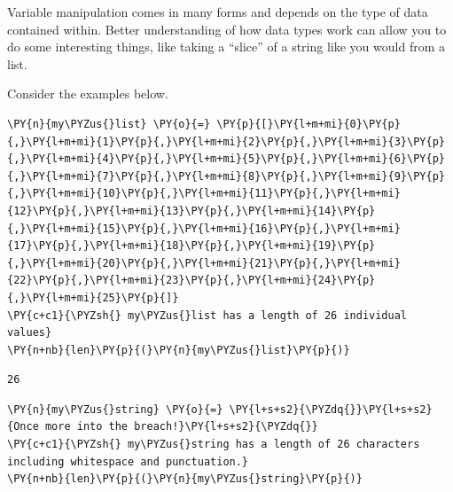 Variable manipulation comes in many forms and depends on the type of
data contained within. Better understanding of how data types work can
allow you to do some interesting things, like taking a ``slice'' of a
string like you would from a list.

Consider the examples below.

    \begin{tcolorbox}[breakable, size=fbox, boxrule=1pt, pad at break*=1mm,colback=cellbackground, colframe=cellborder]
\begin{Verbatim}[commandchars=\\\{\}]
\PY{n}{my\PYZus{}list} \PY{o}{=} \PY{p}{[}\PY{l+m+mi}{0}\PY{p}{,}\PY{l+m+mi}{1}\PY{p}{,}\PY{l+m+mi}{2}\PY{p}{,}\PY{l+m+mi}{3}\PY{p}{,}\PY{l+m+mi}{4}\PY{p}{,}\PY{l+m+mi}{5}\PY{p}{,}\PY{l+m+mi}{6}\PY{p}{,}\PY{l+m+mi}{7}\PY{p}{,}\PY{l+m+mi}{8}\PY{p}{,}\PY{l+m+mi}{9}\PY{p}{,}\PY{l+m+mi}{10}\PY{p}{,}\PY{l+m+mi}{11}\PY{p}{,}\PY{l+m+mi}{12}\PY{p}{,}\PY{l+m+mi}{13}\PY{p}{,}\PY{l+m+mi}{14}\PY{p}{,}\PY{l+m+mi}{15}\PY{p}{,}\PY{l+m+mi}{16}\PY{p}{,}\PY{l+m+mi}{17}\PY{p}{,}\PY{l+m+mi}{18}\PY{p}{,}\PY{l+m+mi}{19}\PY{p}{,}\PY{l+m+mi}{20}\PY{p}{,}\PY{l+m+mi}{21}\PY{p}{,}\PY{l+m+mi}{22}\PY{p}{,}\PY{l+m+mi}{23}\PY{p}{,}\PY{l+m+mi}{24}\PY{p}{,}\PY{l+m+mi}{25}\PY{p}{]}
\PY{c+c1}{\PYZsh{} my\PYZus{}list has a length of 26 individual values}
\PY{n+nb}{len}\PY{p}{(}\PY{n}{my\PYZus{}list}\PY{p}{)}
\end{Verbatim}
\end{tcolorbox}

            \begin{tcolorbox}[breakable, size=fbox, boxrule=.5pt, pad at break*=1mm, opacityfill=0]
\begin{Verbatim}[commandchars=\\\{\}]
26
\end{Verbatim}
\end{tcolorbox}
        
    \begin{tcolorbox}[breakable, size=fbox, boxrule=1pt, pad at break*=1mm,colback=cellbackground, colframe=cellborder]
\begin{Verbatim}[commandchars=\\\{\}]
\PY{n}{my\PYZus{}string} \PY{o}{=} \PY{l+s+s2}{\PYZdq{}}\PY{l+s+s2}{Once more into the breach!}\PY{l+s+s2}{\PYZdq{}}
\PY{c+c1}{\PYZsh{} my\PYZus{}string has a length of 26 characters including whitespace and punctuation.}
\PY{n+nb}{len}\PY{p}{(}\PY{n}{my\PYZus{}string}\PY{p}{)}
\end{Verbatim}
\end{tcolorbox}

